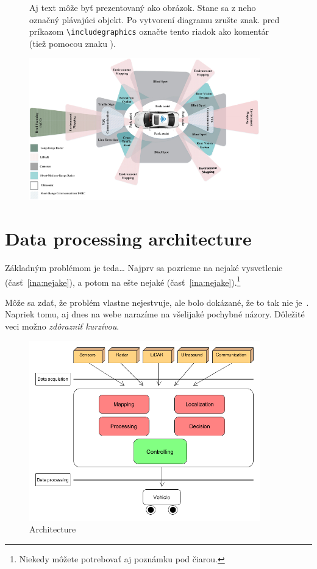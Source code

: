\documentclass[10pt,oneside,english,a4paper]{article}
\begin{document}
\begin{figure}
Aj text môže byť prezentovaný ako obrázok. Stane sa z neho označný plávajúci objekt. Po vytvorení diagramu zrušte znak. pred príkazom \verb|\includegraphics| označte tento riadok ako komentár (tiež pomocou znaku ).


\centering
    \includegraphics[width=10cm]{sensors.png}
    \caption{}
    \label{fig:sensors}
    
\end{figure}

\section{Data processing architecture} \label{architecture}

Základným problémom je teda\ldots{} Najprv sa pozrieme na nejaké vysvetlenie (časť~\ref{ina:nejake}), a potom na ešte nejaké (časť~\ref{ina:nejake}).\footnote{Niekedy môžete potrebovať aj poznámku pod čiarou.}

Môže sa zdať, že problém vlastne nejestvuje\cite{Coplien:MPD}, ale bolo dokázané, že to tak nie je~\cite{Czarnecki:Staged, Czarnecki:Progress}. Napriek tomu, aj dnes na webe narazíme na všelijaké pochybné názory\cite{PLP-Framework}. Dôležité veci možno \emph{zdôrazniť kurzívou}.

\begin{figure}


\centering
    \includegraphics[width=10cm]{architecture.png}
    \caption{Architecture}
    \label{fig:architecture}

\end{figure}
\end{document}
